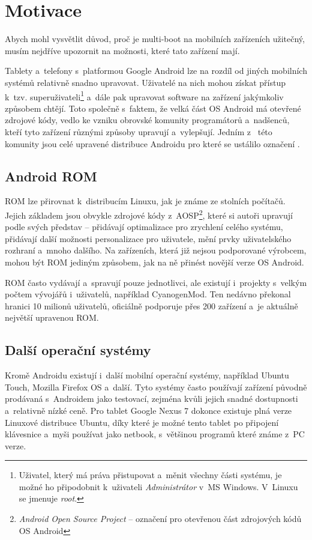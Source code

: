 \documentclass[12pt, a4paper, oneside]{article}
\newcommand{\It}{\textit}  %
\begin{document}
\section{Motivace}
Abych mohl vysvětlit důvod, proč je multi-boot na mobilních zařízeních užitečný, musím nejdříve upozornit na možnosti, které tato zařízení mají.

Tablety a~telefony s~platformou Google Android lze na rozdíl od jiných mobilních systémů relativně snadno upravovat. Uživatelé na nich mohou získat přístup k~tzv. superuživateli\footnote{Uživatel, který má práva přistupovat a~měnit všechny části systému, je možné ho připodobnit k~uživateli \It{Administrátor} v~MS Windows. V~Linuxu se jmenuje \It{root}.} a~dále pak upravovat software na zařízení jakýmkoliv způsobem chtějí. Toto společně s~faktem, že velká část OS Android má otevřené zdrojové kódy, vedlo ke vzniku obrovské komunity programátorů a~nadšenců, kteří tyto zařízení různými způsoby upravují a~vylepšují. Jedním z~ této komunity jsou celé upravené distribuce Androidu pro které se ustálilo označení .

\subsection{Android ROM}
ROM lze přirovnat k~distribucím Linuxu, jak je známe ze stolních počítačů. Jejich základem jsou obvykle zdrojové kódy z~AOSP\cite{aosp}\footnote{\It{Android Open Source Project} -- označení pro otevřenou část zdrojových kódů OS Android}, které si autoři upravují podle svých představ -- přidávají optimalizace pro zrychlení celého systému, přidávají další možnosti personalizace pro uživatele, mění prvky uživatelského rozhraní a~mnoho dalšího. Na zařízeních, která již nejsou podporované výrobcem, mohou být ROM jediným způsobem, jak na ně přinést novější verze OS Android.

ROM často vydávají a~spravují pouze jednotlivci, ale existují i~projekty s~velkým počtem vývojářů i~uživatelů, například CyanogenMod\cite{CM}. Ten nedávno překonal hranici 10 milionů uživatelů, oficiálně podporuje přes 200 zařízení a~je aktuálně největší upravenou ROM.

\subsection{Další operační systémy}
Kromě Androidu existují i~další mobilní operační systémy, například Ubuntu Touch\cite{utouch}, Mozilla Firefox OS\cite{firefoxos} a~další. Tyto systémy často používají zařízení původně prodávaná s~Androidem jako testovací, zejména kvůli jejich snadné dostupnosti a~relativně nízké ceně. Pro tablet Google Nexus 7 dokonce existuje plná verze Linuxové distribuce Ubuntu, díky které je možné tento tablet po připojení klávesnice a~myši používat jako netbook, s~většinou programů které známe z~PC verze.
\end{document}
